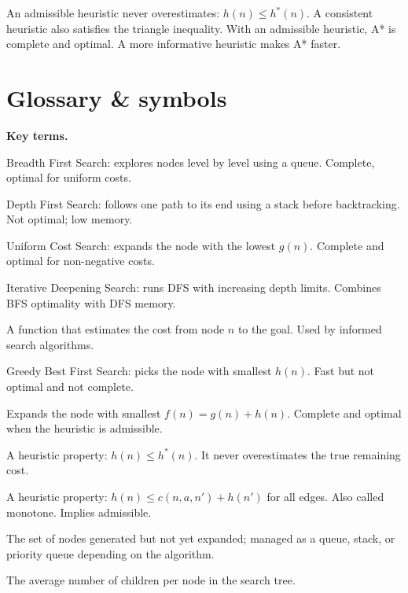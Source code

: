 \documentclass[a4paper,11pt]{article}
\begin{document}
\begin{keytake}
An admissible heuristic never overestimates: $h(n) \le h^*(n)$. A
consistent heuristic also satisfies the triangle inequality. With an
admissible heuristic, A* is complete and optimal. A more informative
heuristic makes A* faster.
\end{keytake}

\section*{Glossary \& symbols}

\noindent\textbf{Key terms.}
\begin{description}[leftmargin=8.5em,style=nextline,
                    font=\normalfont\bfseries\color{navy}]
  \item[BFS] Breadth First Search: explores nodes level by level using a
    queue. Complete, optimal for uniform costs.
  \item[DFS] Depth First Search: follows one path to its end using a stack
    before backtracking. Not optimal; low memory.
  \item[UCS] Uniform Cost Search: expands the node with the lowest $g(n)$.
    Complete and optimal for non-negative costs.
  \item[IDS] Iterative Deepening Search: runs DFS with increasing depth
    limits. Combines BFS optimality with DFS memory.
  \item[heuristic $h(n)$] A function that estimates the cost from node $n$
    to the goal. Used by informed search algorithms.
  \item[GBFS] Greedy Best First Search: picks the node with smallest $h(n)$.
    Fast but not optimal and not complete.
  \item[A*] Expands the node with smallest $f(n)=g(n)+h(n)$. Complete and
    optimal when the heuristic is admissible.
  \item[admissible] A heuristic property: $h(n) \le h^*(n)$. It never
    overestimates the true remaining cost.
  \item[consistent] A heuristic property: $h(n) \le c(n,a,n')+h(n')$ for
    all edges. Also called monotone. Implies admissible.
  \item[frontier] The set of nodes generated but not yet expanded; managed
    as a queue, stack, or priority queue depending on the algorithm.
  \item[branching factor $b$] The average number of children per node in
    the search tree.
\end{description}
\end{document}
